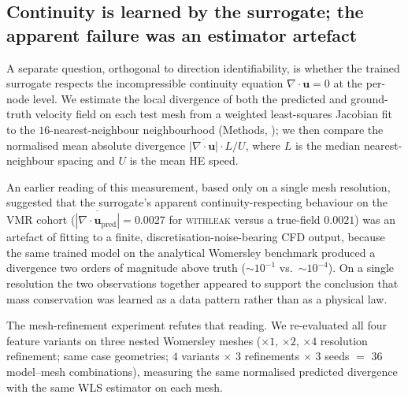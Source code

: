 \documentclass[10pt,a4paper]{article}
\newcommand{\withleak}{\textsc{withleak}}
\begin{document}
\subsection*{Continuity is learned by the surrogate; the apparent failure was an estimator artefact}
\label{sec:continuity}

A separate question, orthogonal to direction identifiability, is
whether the trained surrogate respects the incompressible
continuity equation $\nabla\!\cdot\!\mathbf{u}=0$ at the per-node
level. We estimate the local divergence of both the predicted and
ground-truth velocity field on each test mesh from a weighted
least-squares Jacobian fit to the $16$-nearest-neighbour
neighbourhood (Methods, ); we then compare the
normalised mean absolute divergence
$\overline{|\nabla\!\cdot\!\mathbf{u}|}\cdot L/U$, where $L$ is the
median nearest-neighbour spacing and $U$ is the mean HE speed.

An earlier reading of this measurement, based only on a single mesh
resolution, suggested that the surrogate's apparent
continuity-respecting behaviour on the VMR cohort
($\overline{|\nabla\!\cdot\!\mathbf{u}_\mathrm{pred}|}=0.0027$ for
\withleak{} versus a true-field $0.0021$) was an artefact of fitting
to a finite, discretisation-noise-bearing CFD output, because the same
trained model on the analytical Womersley benchmark produced a
divergence two orders of magnitude above truth
($\sim\!10^{-1}$ vs.\ $\sim\!10^{-4}$). On a single resolution the
two observations together appeared to support the conclusion that
mass conservation was learned as a data pattern rather than as a
physical law.

The mesh-refinement experiment refutes that reading. We re-evaluated
all four feature variants on three nested Womersley meshes
($\times 1$, $\times 2$, $\times 4$ resolution refinement; same case
geometries; $4$ variants $\times$ $3$ refinements $\times$ $3$ seeds
$=$ 36 model--mesh combinations), measuring the same normalised
predicted divergence with the same WLS estimator on each mesh.
\end{document}

